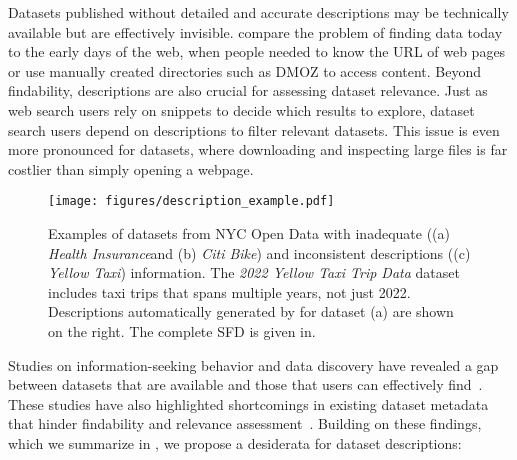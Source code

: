 Datasets published without detailed and accurate descriptions may be technically available but are effectively invisible. \citet{koesten2017trials} compare the problem of finding data today to the early days of the web, when people needed to know the URL of web pages or use manually created directories such as DMOZ to access content.
%
Beyond findability, descriptions are also crucial for assessing dataset relevance. Just as web search users rely on snippets to decide which results to explore, dataset search users depend on descriptions to filter relevant datasets. This issue is even more pronounced for datasets, where downloading and inspecting large files is far costlier than simply opening a webpage.


\begin{figure*}[ht]
  \texttt{[image: figures/description\_example.pdf]}
  \vspace{-0.3cm}
  \caption[]{Examples of datasets from NYC Open Data with inadequate ((a) \textit{Health Insurance}\footnotemark and (b) \textit{Citi Bike}\footnotemark) and inconsistent descriptions  ((c) \textit{Yellow Taxi}\footnotemark) information. The \textit{2022 Yellow Taxi Trip Data} dataset includes taxi trips that spans multiple years, not just 2022. Descriptions automatically generated by \SystemName for dataset (a) are shown on the right. The complete SFD is given in.
  }
  \label{fig:example_original_generate_description}
  \vspace{-0.3cm}
\end{figure*}


\vspace{.5em}
%
Studies on information-seeking behavior and data discovery have revealed a gap between datasets that are available and those that users can effectively find~\cite{chapman2020dataset}. These studies have also highlighted shortcomings in existing dataset metadata that hinder findability and relevance assessment~\cite{papenmeier2021genuine, koesten2017trials, Sostek2024Discovering}. Building on these findings, which we summarize in , we propose a desiderata for dataset descriptions:

